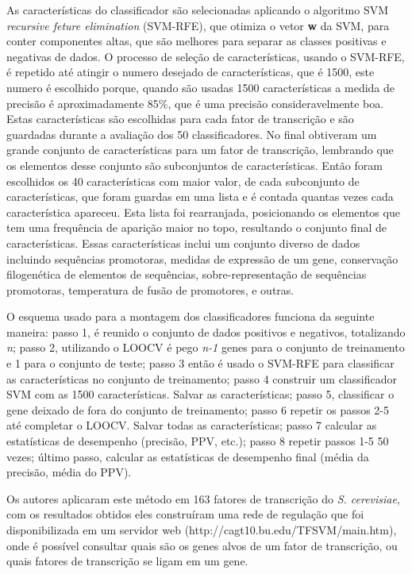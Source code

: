 As características do classificador são selecionadas aplicando o algoritmo SVM \textit{recursive feture elimination} (SVM-RFE), que otimiza o vetor \textbf{w} da SVM, para conter componentes altas, que são melhores para separar as classes positivas e negativas de dados. O processo de seleção de características, usando o SVM-RFE, é repetido até atingir o numero desejado de características, que é 1500, este numero é escolhido porque, quando são usadas 1500 características a medida de precisão é aproximadamente 85\%, que é uma precisão consideravelmente boa. Estas características são escolhidas para cada fator de transcrição e são guardadas durante a avaliação dos 50 classificadores. No final obtiveram um grande conjunto de características para um fator de transcrição, lembrando que os elementos desse conjunto são subconjuntos de características. Então foram escolhidos os 40 características com maior valor, de cada subconjunto de características, que foram guardas em uma lista e é contada quantas vezes cada característica apareceu. Esta lista foi rearranjada, posicionando os elementos que tem uma frequência de aparição maior no topo, resultando o conjunto final de características. Essas características inclui um conjunto diverso de dados incluindo sequências promotoras, medidas de expressão de um gene, conservação filogenética de elementos de sequências, sobre-representação de sequências promotoras, temperatura de fusão de promotores, e outras.

O esquema usado para a montagem dos classificadores funciona da seguinte maneira: passo 1, é reunido o conjunto de dados positivos e negativos, totalizando \textit{n}; passo 2, utilizando o LOOCV é pego \textit{n-1} genes para o conjunto de treinamento e 1 para o conjunto de teste; passo 3 então é usado o SVM-RFE para classificar as características no conjunto de treinamento; passo 4 construir um classificador SVM com as 1500 características. Salvar as características; passo 5, classificar o gene deixado de fora do conjunto de treinamento; passo 6 repetir os passos 2-5 até completar o LOOCV. Salvar todas as características; passo 7 calcular as estatísticas de desempenho (precisão, PPV, etc.); passo 8 repetir passos 1-5 50 vezes; último passo, calcular as estatísticas de desempenho final (média da precisão, média do PPV).

Os autores aplicaram este método em 163 fatores de transcrição do \textit{S. cerevisiae}, com os resultados obtidos eles construíram uma rede de regulação que foi disponibilizada em um servidor web (http://cagt10.bu.edu/TFSVM/main.htm), onde é possível consultar quais são os genes alvos de um fator de transcrição, ou quais fatores de transcrição se ligam em um gene.

